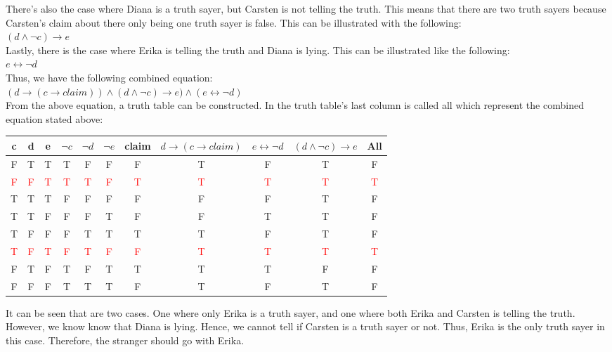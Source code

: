\begin{enumerate}
There's also the case where Diana is a truth sayer, but Carsten is not telling the truth. This means that there are two truth sayers because Carsten's claim about there only being one truth sayer is false. This can be illustrated with the following:\\
$ (d \land \neg c) \to e$ \\

Lastly, there is the case where Erika is telling the truth and Diana is lying. This can be illustrated like the following: \\
$e \leftrightarrow \neg d$ \\

Thus, we have the following combined equation: \\
$(d \to (c \to claim)) \land (d \land \neg c) \to e) \land (e \leftrightarrow \neg d)$ \\

From the above equation, a truth table can be constructed. In the truth table's last column is called all which represent the combined equation stated above:
\begin{center}
\begin{tabular}{ |c|c|c|c|c|c|c|c|c|c|c| } 
\hline
c & d & e & $\neg c$ & $\neg d$ & $\neg e$ & claim & $ d \to (c \to claim)$ & $e \leftrightarrow \neg d$ & $(d \land \neg c) \to e$ & All \\
\hline
\hline
F & T & T & T & F & F & F & T & F & T & F \\
\hline
\textcolor{red}{F} & \textcolor{red}{F} & \textcolor{red}{T} & \textcolor{red}{T} & \textcolor{red}{T} & \textcolor{red}{F} & \textcolor{red}{T} & \textcolor{red}{T} & \textcolor{red}{T} & \textcolor{red}{T} & \textcolor{red}{T} \\
\hline
T & T & T & F & F & F & F & F & F & T & F \\
\hline
T & T & F & F & F & T & F & F & T & T & F \\
\hline
T & F & F & F & T & T & T & T & F & T & F \\
\hline
\textcolor{red}{T} & \textcolor{red}{F} & \textcolor{red}{T} & \textcolor{red}{F} & \textcolor{red}{T} & \textcolor{red}{F} & \textcolor{red}{F} & \textcolor{red}{T} & \textcolor{red}{T} & \textcolor{red}{T} & \textcolor{red}{T} \\
\hline
F & T & F & T & F & T & T & T & T & F & F \\
\hline
F & F & F & T & T & T & F & T & F & T & F \\
\hline
\end{tabular}
\end{center}

It can be seen that are two cases. One where only Erika is a truth sayer, and one where both Erika and Carsten is telling the truth. However, we know know that Diana is lying. Hence, we cannot tell if Carsten is a truth sayer or not. Thus, Erika is the only truth sayer in this case. Therefore, the stranger should go with Erika. 

\end{enumerate}